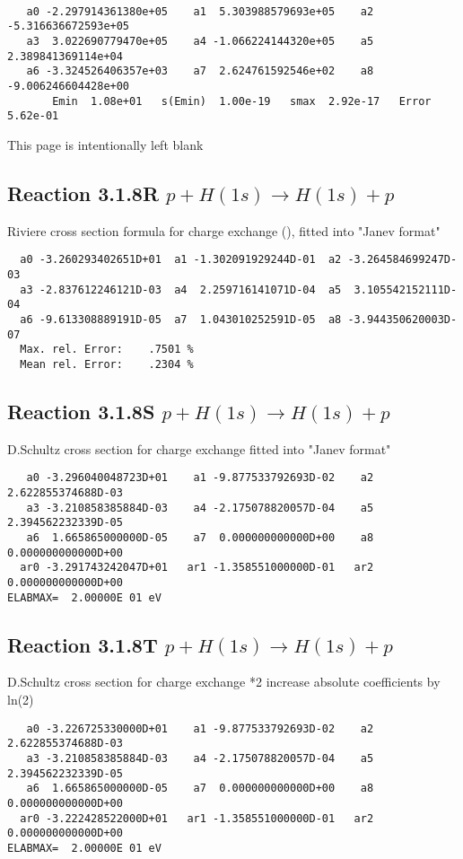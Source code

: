 \begin{verbatim}

   a0 -2.297914361380e+05    a1  5.303988579693e+05    a2 -5.316636672593e+05
   a3  3.022690779470e+05    a4 -1.066224144320e+05    a5  2.389841369114e+04
   a6 -3.324526406357e+03    a7  2.624761592546e+02    a8 -9.006246604428e+00
       Emin  1.08e+01   s(Emin)  1.00e-19   smax  2.92e-17   Error  5.62e-01
\end{verbatim}
\newpage
This page is intentionally left blank
\newpage

\subsection{
Reaction 3.1.8R $  p + H(1s) \rightarrow H(1s) + p  $
}
Riviere cross section formula for charge exchange
(\cite{kn:Riviere}), fitted into
"Janev format"

\begin{verbatim}
  a0 -3.260293402651D+01  a1 -1.302091929244D-01  a2 -3.264584699247D-03
  a3 -2.837612246121D-03  a4  2.259716141071D-04  a5  3.105542152111D-04
  a6 -9.613308889191D-05  a7  1.043010252591D-05  a8 -3.944350620003D-07
  Max. rel. Error:    .7501 %
  Mean rel. Error:    .2304 %
\end{verbatim}

\subsection{
Reaction 3.1.8S $  p + H(1s) \rightarrow H(1s) + p  $
}

D.Schultz cross section for charge exchange
fitted into "Janev format"


\begin{verbatim}
   a0 -3.296040048723D+01    a1 -9.877533792693D-02    a2  2.622855374688D-03
   a3 -3.210858385884D-03    a4 -2.175078820057D-04    a5  2.394562232339D-05
   a6  1.665865000000D-05    a7  0.000000000000D+00    a8  0.000000000000D+00
  ar0 -3.291743242047D+01   ar1 -1.358551000000D-01   ar2  0.000000000000D+00
ELABMAX=  2.00000E 01 eV
\end{verbatim}
\subsection{
Reaction 3.1.8T $  p + H(1s) \rightarrow H(1s) + p  $
}
D.Schultz cross section for charge exchange *2
increase absolute coefficients by ln(2)

\begin{verbatim}
   a0 -3.226725330000D+01    a1 -9.877533792693D-02    a2  2.622855374688D-03
   a3 -3.210858385884D-03    a4 -2.175078820057D-04    a5  2.394562232339D-05
   a6  1.665865000000D-05    a7  0.000000000000D+00    a8  0.000000000000D+00
  ar0 -3.222428522000D+01   ar1 -1.358551000000D-01   ar2  0.000000000000D+00
ELABMAX=  2.00000E 01 eV
\end{verbatim}

